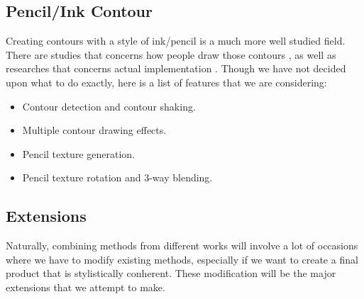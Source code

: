 \documentclass[acmtog, table, dvipsnames]{acmart}
\begin{document}
\subsection{Pencil/Ink Contour}
Creating contours with a style of ink/pencil is a much more well studied field. There are studies that concerns how people draw those contours \cite{cole2008people}, as well as researches that concerns actual implementation \cite{praun2001real} \cite{lee2006real}. Though we have not decided upon what to do exactly, here is a list of features that we are considering:
\begin{itemize}
   \item Contour detection and contour shaking.
   \item Multiple contour drawing effects.
   \item Pencil texture generation. 
   \item Pencil texture rotation and 3-way blending.
\end{itemize}
%
\subsection{Extensions}
Naturally, combining methods from different works will involve a lot of occasions where we have to modify existing methods, especially if we want to create a final product that is stylistically conherent. These modification will be the major extensions that we attempt to make.
\end{document}
